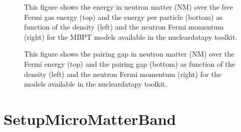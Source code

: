 \documentclass[letterpaper,10pt,english]{sphinxmanual}
\begin{document}
\begin{figure}[htbp]
\centering
\capstart

\noindent{}
\caption{This figure shows the energy in neutron matter (NM) over the free Fermi gas energy (top) and the energy per particle (bottom) as function of the density (left) and the neutron Fermi momentum (right) for the MBPT models available in the nucleardatapy toolkit.}\label{\detokenize{source/api/setup_micro_matter:id5}}\end{figure}

\begin{figure}[htbp]
\centering
\capstart

\noindent{}
\caption{This figure shows the pairing gap in neutron matter (NM) over the Fermi energy (top) and the pairing gap (bottom) as function of the density (left) and the neutron Fermi momentum (right) for the models available in the nucleardatapy toolkit.}\label{\detokenize{source/api/setup_micro_matter:id6}}\end{figure}

\sphinxstepscope


\section{SetupMicroMatterBand}
\label{\detokenize{source/api/setup_micro_matter_band:setupmicromatterband}}\label{\detokenize{source/api/setup_micro_matter_band::doc}}\label{\detokenize{source/api/setup_micro_matter_band:module-nucleardatapy.setup_micro_matter_band}}
\end{document}
